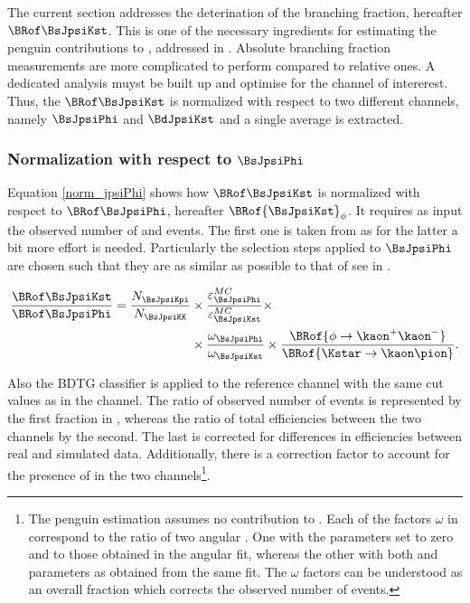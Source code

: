 
The current section addresses the deterination of the \BsJpsiKst branching fraction, hereafter $\BRof\BsJpsiKst$.
This is one of the necessary ingredients for estimating the penguin contributions to \phis, addressed in .
Absolute branching fraction measurements are more complicated to perform compared to relative ones. A dedicated analysis
muyst be built up and optimise for the channel of intererest. Thus, the $\BRof\BsJpsiKst$ is normalized with respect
to two different channels, namely $\BsJpsiPhi$ and $\BdJpsiKst$ and a single average is extracted.

\subsubsection{Normalization with respect to $\BsJpsiPhi$}
Equation \ref{norm_jpsiPhi} shows how $\BRof\BsJpsiKst$ is normalized with respect to $\BRof\BsJpsiPhi$, hereafter $\BRof{\BsJpsiKst}_\phi$.
It requires as input the observed number of \BsJpsiKst and \BsJpsiPhi events. The first one is taken from  as for
the latter a bit more effort is needed. Particularly the selection steps applied to $\BsJpsiPhi$
are chosen such that they are as similar as possible to that of \BsJpsiKst see in .

\begin{align}
\frac{\BRof\BsJpsiKst}{\BRof\BsJpsiPhi} = \frac{N_{\BsJpsiKpi}}{N_{\BsJpsiKK}} &\times \frac{\varepsilon_{\BsJpsiPhi}^{MC}}{\varepsilon_{\BsJpsiKst}^{MC}} \times \nonumber \\
                                                                          &\times \frac{\omega_{\BsJpsiPhi}}{\omega_{\BsJpsiKst}} \times \frac{\BRof{\phi\to\kaon^+\kaon^-}}{\BRof{\Kstar\to\kaon\pion}}.
\label{norm_jpsiPhi}
\end{align}

\noindent Also the BDTG classifier is applied to the reference channel
with the same cut values as in the \BsJpsiKst channel. The ratio of observed number of events is represented by the first fraction in ,
whereas the ratio of total efficiencies between the two channels by the second. The last is corrected for differences in efficiencies between real and
simulated data. Additionally, there is a correction factor to account for the presence of \swave in the two
channels\footnote{The penguin estimation assumes no \swave contribution to \BsJpsiKst. Each of the factors $\omega$ in  correspond
to the ratio of two angular \pdfs. One with the \swave parameters set to zero and \pwave to those obtained in the angular fit,  whereas the other
with both \pwave and \swave parameters as obtained from the same fit. The $\omega$ factors can be understood as an overall \swave fraction which
corrects the observed number of events.
}.

